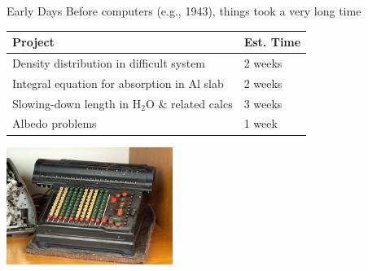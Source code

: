 \documentclass[xcolor=x11names,compress]{beamer}
\renewcommand{\(}{\begin{columns}}
\renewcommand{\)}{\end{columns}}
\newcommand{\<}[1]{\begin{column}{#1}}
\renewcommand{\>}{\end{column}}
\begin{document}
\begin{frame}{Early Days}
Before computers (e.g., 1943), things took a very long time
\begin{tabu}{|X| l|}
\hline
Project & Est. Time \\\hline
Density distribution in difficult system & 2 weeks \\
Integral equation for absorption in Al slab & 2 weeks \\
Slowing-down length in H$_2$O \& related calcs & 3 weeks \\
Albedo problems & 1 week \\\hline
\end{tabu}
\begin{center}
\includegraphics[height=1.5in,clip]{ACRM}
\end{center}
\end{frame}
\end{document}
